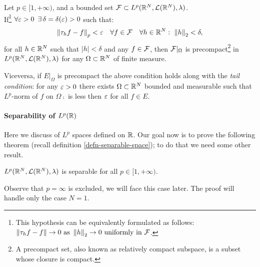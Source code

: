 \begin{theo}\label{theo-KRF}
	Let $p\in [1, +\infty)$, and a bounded set $\mathcal F \subset L^p(\mathbb R^N, \mathcal L(\mathbb R^N),\lambda)$.\\
	If\footnote{This hypothesis can be equivalently formulated as follows: $\left\lVert\tau_h f - f\right\rVert \to 0 \text{ as }\left\lVert h\right\rVert_2 \to 0 \text{ uniformly in }\mathcal F$.} $\forall \varepsilon > 0 \enspace \exists\, \delta = \delta (\varepsilon) > 0$ such that:
	$$
	\left\lVert\tau_hf-f\right\rVert_p < \varepsilon \quad
	\forall f \in \mathcal F \quad
	\forall h \in \mathbb R^N :\ \left\lVert h\right\rVert_2 < \delta,
	$$
	for all $h\in\mathbb R^N$ such that $|h| < \delta$ and any $f \in \mathcal F$, then $\mathcal F|_\Omega$ is precompact\footnote{A precompact set, also known as relatively compact subspace, is a subset whose closure is compact.} in $L^p(\mathbb R^N, \mathcal L(\mathbb R^N),\lambda)$ for any $\Omega \subset \mathbb R^N$ of finite measure.
	
	Viceversa, if $E|_\Omega$ is precompact the above condition holds along with the \textit{tail condition}: for any $\varepsilon > 0$ there exists $\Omega \subset \mathbb R^N$ bounded and measurable such that $L^p$-norm of $f$ on $\Omega\comp$ is less then $\varepsilon$ for all $f \in E$.
\end{theo}
%
%



\paragraph{Separability of $L^p(\mathbb R)$} Here we discuss of $L^p$ spaces defined on $\mathbb R$. Our goal now is to prove the following theorem (recall definition \vref{defn-separable-space}); to do that we need some other result.
\begin{theo}\label{Lp-separable}
	$L^p(\mathbb R^N, \mathcal L(\mathbb R^N), \lambda)$ is separable for all $p \in [1, +\infty)$.
\end{theo}
Observe that $p = \infty$ is excluded, we will face this case later. The proof will handle only the case $N = 1$. 


